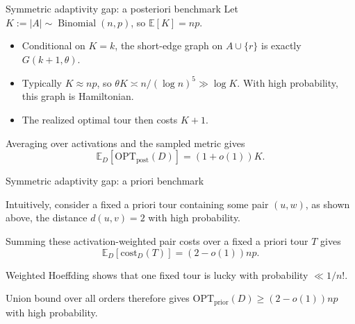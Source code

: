 \documentclass[aspectratio=169,12pt]{beamer}
\newcommand{\OPT}{\mathrm{OPT}}
\newcommand{\optpost}{\OPT_{\mathrm{post}}}
\newcommand{\optprior}{\OPT_{\mathrm{prior}}}
\newcommand{\E}{\mathbb{E}}
\begin{document}
\begin{frame}{Symmetric adaptivity gap: a posteriori benchmark}
  Let \(K:=|A|\sim\operatorname{Binomial}(n,p)\), so \(\E[K]=np\).

  \begin{itemize}\setlength{\itemsep}{0.52em}
    \item Conditional on \(K=k\), the short-edge graph on
      \(A\cup\{r\}\) is exactly \(G(k+1,\theta)\).
    \item Typically \(K\approx np\), so
      \(\theta K\asymp n/(\log n)^5\gg\log K\).
      With high probability, this graph is Hamiltonian.
    \item The realized optimal tour then costs
      \(K+1\).
  \end{itemize}

  Averaging over activations and the sampled metric gives
  \[
    \E_D[\optpost(D)]=(1+o(1))K.
  \]
\end{frame}

\begin{frame}{Symmetric adaptivity gap: a priori benchmark}
    \resizebox{0.75\linewidth}{!}{\ThRandomShortcutPair}

    \medskip
    Intuitively, consider a fixed a priori tour containing some pair $(u,w)$, as shown above, the distance $d(u,v) = 2$ with high probability.

    Summing these activation-weighted pair costs over a fixed a priori tour \(T\)
    gives
    \[
        \E_D[\text{cost}_D(T)]=(2-o(1))np.
    \]

    Weighted Hoeffding shows that one fixed tour is lucky
    with probability \(\ll1/n!\).

    Union bound over all orders therefore gives \(\optprior(D)\ge(2-o(1))np\) with high probability.
\end{frame}
\end{document}
